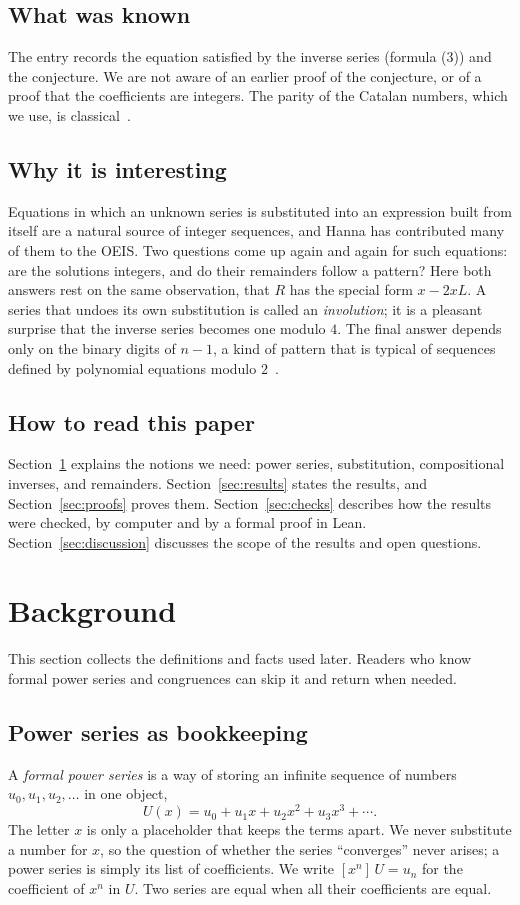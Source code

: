 \documentclass[11pt,a4paper]{article}
\theoremstyle{definition}
\theoremstyle{remark}
\newcommand{\coeff}[2]{[x^{#1}]\,#2}
\begin{document}
\subsection{What was known}
The entry records the equation satisfied by the inverse series (formula (3)) and the conjecture. We are not aware of an
earlier proof of the conjecture, or of a proof that the coefficients are integers. The parity of the Catalan numbers,
which we use, is classical~\cite{deutschsagan}.

\subsection{Why it is interesting}
Equations in which an unknown series is substituted into an expression built from itself are a natural source of
integer sequences, and Hanna has contributed many of them to the OEIS. Two questions come up again and again for such
equations: are the solutions integers, and do their remainders follow a pattern? Here both answers rest on the same
observation, that $R$ has the special form $x-2xL$. A series that undoes its own substitution is called an
\emph{involution}; it is a pleasant surprise that the inverse series becomes one modulo $4$. The final answer depends only
on the binary digits of $n-1$, a kind of pattern that is typical of sequences defined by polynomial equations modulo
$2$~\cite{allouche,christol}.

\subsection{How to read this paper}
Section~\ref{sec:background} explains the notions we need: power series, substitution, compositional inverses, and
remainders. Section~\ref{sec:results} states the results, and Section~\ref{sec:proofs} proves them.
Section~\ref{sec:checks} describes how the results were checked, by computer and by a formal proof in Lean.
Section~\ref{sec:discussion} discusses the scope of the results and open questions.
\section{Background}\label{sec:background}
This section collects the definitions and facts used later. Readers who know formal power series and congruences can skip it and return when needed.
\subsection{Power series as bookkeeping}
A \emph{formal power series} is a way of storing an infinite sequence of numbers $u_0,u_1,u_2,\dots$ in one object,
\[
U(x)=u_0+u_1x+u_2x^2+u_3x^3+\cdots .
\]
The letter $x$ is only a placeholder that keeps the terms apart. We never substitute a number for $x$, so the question
of whether the series ``converges'' never arises; a power series is simply its list of coefficients. We write
$\coeff{n}{U}=u_n$ for the coefficient of $x^n$ in $U$. Two series are equal when all their coefficients are equal.
\end{document}
